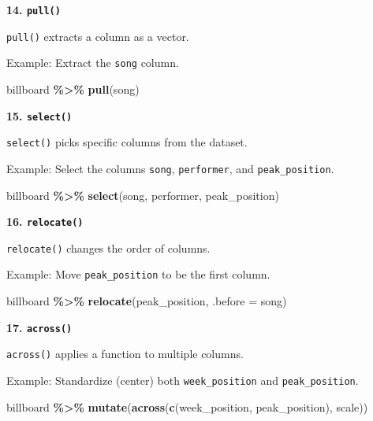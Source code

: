 \documentclass[
]{book}
\newenvironment{Shaded}{\begin{snugshade}}{\end{snugshade}}
\newcommand{\AttributeTok}[1]{\textcolor[rgb]{0.13,0.29,0.53}{#1}}
\newcommand{\FunctionTok}[1]{\textcolor[rgb]{0.13,0.29,0.53}{\textbf{#1}}}
\newcommand{\NormalTok}[1]{#1}
\newcommand{\SpecialCharTok}[1]{\textcolor[rgb]{0.81,0.36,0.00}{\textbf{#1}}}
\begin{document}
\textbf{14. \texttt{pull()}}

\texttt{pull()} extracts a column as a vector.

Example: Extract the \texttt{song} column.

\begin{Shaded}
\begin{Highlighting}[]
\NormalTok{billboard }\SpecialCharTok{\%\textgreater{}\%}
  \FunctionTok{pull}\NormalTok{(song)}
\end{Highlighting}
\end{Shaded}

\textbf{15. \texttt{select()}}

\texttt{select()} picks specific columns from the dataset.

Example: Select the columns \texttt{song}, \texttt{performer}, and \texttt{peak\_position}.

\begin{Shaded}
\begin{Highlighting}[]
\NormalTok{billboard }\SpecialCharTok{\%\textgreater{}\%}
  \FunctionTok{select}\NormalTok{(song, performer, peak\_position)}
\end{Highlighting}
\end{Shaded}

\textbf{16. \texttt{relocate()}}

\texttt{relocate()} changes the order of columns.

Example: Move \texttt{peak\_position} to be the first column.

\begin{Shaded}
\begin{Highlighting}[]
\NormalTok{billboard }\SpecialCharTok{\%\textgreater{}\%}
  \FunctionTok{relocate}\NormalTok{(peak\_position, }\AttributeTok{.before =}\NormalTok{ song)}
\end{Highlighting}
\end{Shaded}

\textbf{17. \texttt{across()}}

\texttt{across()} applies a function to multiple columns.

Example: Standardize (center) both \texttt{week\_position} and \texttt{peak\_position}.

\begin{Shaded}
\begin{Highlighting}[]
\NormalTok{billboard }\SpecialCharTok{\%\textgreater{}\%}
  \FunctionTok{mutate}\NormalTok{(}\FunctionTok{across}\NormalTok{(}\FunctionTok{c}\NormalTok{(week\_position, peak\_position), scale))}
\end{Highlighting}
\end{Shaded}
\end{document}
